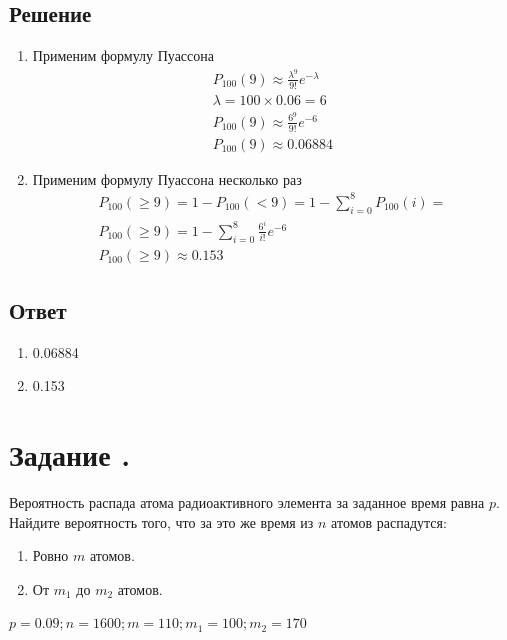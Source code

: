 \documentclass[12pt]{article}
\begin{document}
\subsection*{Решение}
\begin{enumerate}
	\item Применим формулу Пуассона
	      \begin{gather*}
		      P_{100}(9) \approx \frac{\lambda^9}{9!}e^{-\lambda} \\
		      \lambda = 100 \times 0.06 = 6 \\
		      P_{100}(9) \approx \frac{6^9}{9!}e^{-6} \\
		      P_{100}(9) \approx 0.06884
	      \end{gather*}
	\item Применим формулу Пуассона несколько раз
	      \begin{gather*}
		      P_{100}(\geq9) = 1 - P_{100}(<9) = 1 - \sum_{i=0}^8P_{100}(i) = \\
		      P_{100}(\geq9) = 1 - \sum_{i=0}^8 \frac{6^i}{i!}e^{-6} \\
		      P_{100}(\geq9) \approx 0.153
	      \end{gather*}
\end{enumerate}
\subsection*{Ответ}
\begin{enumerate}
	\item 0.06884
	\item 0.153
\end{enumerate}

\section*{Задание .}
Вероятность распада атома радиоактивного элемента за заданное время равна $p$. Найдите вероятность того, что за это же время из $n$ атомов распадутся:
\begin{enumerate}
	\item Ровно $m$ атомов.
	\item От $m_1$ до $m_2$ атомов.
\end{enumerate}
$p=0.09; n=1600; m=110; m_1=100; m_2=170$
\end{document}
